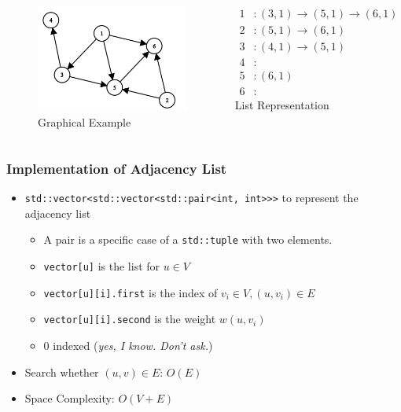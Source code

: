 \documentclass{beamer}
\begin{document}
\begin{frame}
	\begin{columns}
	\begin{figure}
		\includegraphics[scale=0.5]{./pict/exampleGraph.png}
		\caption{Graphical Example}
	\end{figure}

	\begin{align*}
		1 &: (3, 1) \rightarrow (5, 1) \rightarrow (6, 1)\\
		2 &: (5, 1) \rightarrow (6, 1) \\
		3 &: (4, 1) \rightarrow (5, 1) \\
		4 &: \\
		5 &: (6, 1)\\
		6 &: 
	\end{align*}			
	\centering List Representation
			
	\end{columns}
\end{frame}

\begin{frame}
	\frametitle{Implementation of Adjacency List}
	\begin{itemize}
		\item \texttt{std::vector<std::vector<std::pair<int, int>>>} to represent the adjacency list
		\begin{itemize}
			\item A pair is a specific case of a \texttt{std::tuple} with two elements.
			\item \texttt{vector[u]} is the list for \( u \in V \) 
			\item \texttt{vector[u][i].first} is the index of \( v_i \in V, (u, v_i) \in E \) 
			\item \texttt{vector[u][i].second} is the weight \( w(u, v_i) \) 	
			\item 0 indexed (\emph{yes, I know. Don't ask.})
		\end{itemize}
		\item Search whether \( (u, v) \in E \): \( O(E) \)  
		\item Space Complexity: \( O(V+E) \) 
	\end{itemize}
\end{frame}
\end{document}
